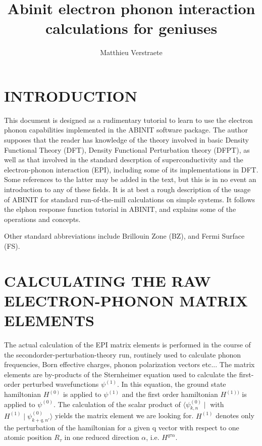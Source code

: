 \documentclass[aps,preprint]{revtex4}
\begin{document}
\title {Abinit electron phonon interaction calculations for geniuses}
\author{Matthieu Verstraete}

\maketitle


\section{INTRODUCTION}
This document is designed as a rudimentary tutorial to learn to use the
electron phonon capabilities implemented in the ABINIT software package. The
author supposes that the reader has knowledge of the theory involved in basic
Density Functional Theory (DFT)\cite{ABINIT_short, payne_1992_review_dft,
hohenberg_1964_DFT, kohn_1965_DFT_LDA}, Density Functional Perturbation theory
(DFPT)\cite{baroni_1987_elast_const_lin_resp, baroni_2001_phonon_review,
gonze_1989_DFT_nonlinear_response, gonze_1997_higher_order_DFTPT,
gonze_1995_perturbation_variational}, as well as that involved in the standard
descrption of superconductivity and the electron-phonon interaction
(EPI)\cite{allen_1982_superconducting_tc}, including some of its
implementations in DFT\cite{dacorogna_1985_EPI, lam_1986_EPI,
savrasov_1996_EPI_implementation}. Some references to the latter may be added
in the text, but this is in no event an introduction to any of these fields.
It is at best a rough description of the usage of ABINIT for standard
run-of-the-mill calculations on simple systems. It follows the elphon response
function tutorial in ABINIT, and explains some of the operations and concepts.

Other standard abbreviations include Brillouin Zone (BZ), and Fermi Surface
(FS).

\section{CALCULATING THE RAW ELECTRON-PHONON MATRIX ELEMENTS}

The actual calculation of the EPI matrix elements is performed in the course of
the secondorder-perturbation-theory run, routinely used to calculate phonon
frequencies, Born effective charges, phonon polarization vectors etc... The
matrix elements are by-products of the Sternheimer equation used to calculate
the first-order perturbed wavefunctions $\psi^{(1)}$. In this equation, the
ground state hamiltonian $H^{(0)}$ is applied to $\psi^{(1)}$ and the first
order hamiltonian $H^{(1))}$ is applied to $\psi^{(0)}$. The calculation of the
scalar product of $\langle \psi^{(0)}_{k,n} \mid$ with $H^{(1)} \mid
\psi^{(0)}_{k+q,n'} \rangle$ yields the matrix element we are looking for. $H^{(1)}$
denotes only the perturbation of the hamiltonian for a given q vector with
respect to one atomic position $R_\tau$ in one reduced direction $\alpha$, i.e.
$H^{q \tau \alpha}$.
\end{document}
